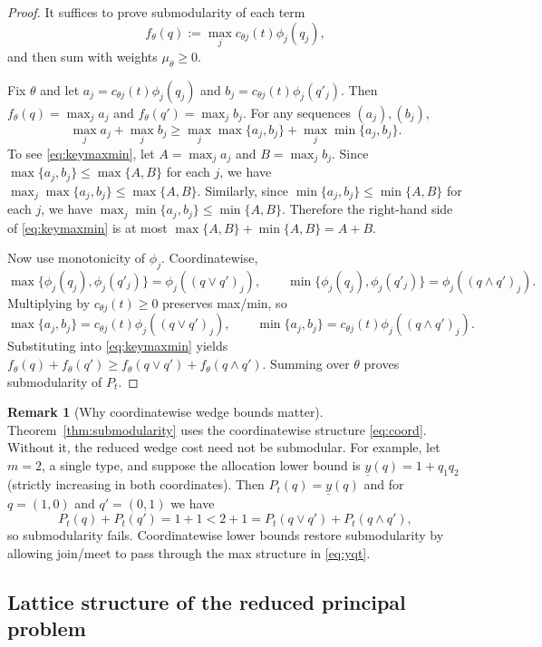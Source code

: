 \documentclass[final,3p,times]{elsarticle}
\theoremstyle{plain}
\theoremstyle{definition}
\newtheorem{remark}{Remark}
\newcommand{\1}{\mathbbm{1}}
\begin{document}
\begin{proof}
It suffices to prove submodularity of each term 
\[
f_\theta(q):=\max_j c_{\theta j}(t)\phi_j(q_j),
\]
and then sum with weights $\mu_\theta\ge 0$.

Fix $\theta$ and let $a_j=c_{\theta j}(t)\phi_j(q_j)$ and $b_j=c_{\theta j}(t)\phi_j(q'_j)$. Then $f_\theta(q)=\max_j a_j$ and $f_\theta(q')=\max_j b_j$. For any sequences $(a_j),(b_j)$,
\begin{equation}\label{eq:keymaxmin}
\max_j a_j+\max_j b_j \ge \max_j \max\{a_j,b_j\} + \max_j \min\{a_j,b_j\}.
\end{equation}
To see \eqref{eq:keymaxmin}, let $A=\max_j a_j$ and $B=\max_j b_j$. Since $\max\{a_j,b_j\}\le \max\{A,B\}$ for each $j$, we have $\max_j\max\{a_j,b_j\}\le \max\{A,B\}$. Similarly, since $\min\{a_j,b_j\}\le \min\{A,B\}$ for each $j$, we have $\max_j\min\{a_j,b_j\}\le \min\{A,B\}$. Therefore the right-hand side of \eqref{eq:keymaxmin} is at most $\max\{A,B\}+\min\{A,B\}=A+B$.

Now use monotonicity of $\phi_j$. Coordinatewise,
\[
\max\{\phi_j(q_j),\phi_j(q'_j)\}=\phi_j((q\vee q')_j),\qquad
\min\{\phi_j(q_j),\phi_j(q'_j)\}=\phi_j((q\wedge q')_j).
\]
Multiplying by $c_{\theta j}(t)\ge 0$ preserves max/min, so
\[
\max\{a_j,b_j\}=c_{\theta j}(t)\phi_j((q\vee q')_j),\qquad
\min\{a_j,b_j\}=c_{\theta j}(t)\phi_j((q\wedge q')_j).
\]
Substituting into \eqref{eq:keymaxmin} yields 
$f_\theta(q)+f_\theta(q')\ge f_\theta(q\vee q')+f_\theta(q\wedge q')$. Summing over $\theta$ proves submodularity of $P_t$.
\end{proof}

\begin{remark}[Why coordinatewise wedge bounds matter]\label{rem:coord-fail}
Theorem~\ref{thm:submodularity} uses the coordinatewise structure \eqref{eq:coord}. Without it, the reduced wedge cost need not be submodular. For example, let $m=2$, a single type, and suppose the allocation lower bound is $\underline y(q)=1+q_1q_2$ (strictly increasing in both coordinates). Then $P_t(q)=\underline y(q)$ and for $q=(1,0)$ and $q'=(0,1)$ we have
\[
P_t(q)+P_t(q')=1+1 < 2+1=P_t(q\vee q')+P_t(q\wedge q'),
\]
so submodularity fails. Coordinatewise lower bounds restore submodularity by allowing join/meet to pass through the max structure in \eqref{eq:yqt}.
\end{remark}

\subsection{Lattice structure of the reduced principal problem}
\end{document}

